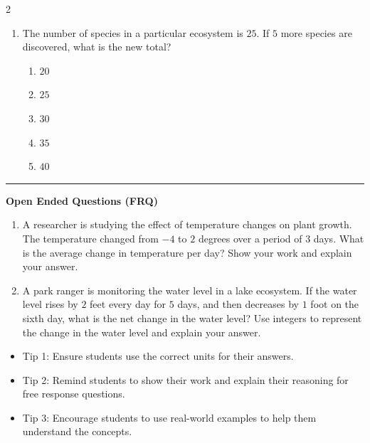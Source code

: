 \documentclass[10pt]{article}
\begin{document}
\begin{multicols}{2}
\begin{enumerate}[label=\textbf{Q\arabic*.}, leftmargin=*, itemsep=6pt, parsep=0pt]
  \item \small The number of species in a particular ecosystem is $25$. If $5$ more species are discovered, what is the new total?
  \begin{enumerate}[label=(\Alph*), leftmargin=0.6cm, nosep, itemsep=2pt]
    \item $20$
    \item $25$
    \item $30$
    \item $35$
    \item $40$
  \end{enumerate}

\end{enumerate}
\end{multicols}

\vspace{-0.2cm}
\hrule
\vspace{0.2cm}
\textbf{\small Open Ended Questions (FRQ)}
\begin{enumerate}[label=\textbf{Q\arabic*.}, start=9, itemsep=5pt, topsep=0pt]

  \item \small A researcher is studying the effect of temperature changes on plant growth. The temperature changed from $-4$ to $2$ degrees over a period of $3$ days. What is the average change in temperature per day? Show your work and explain your answer. \vspace{2cm}

  \item \small A park ranger is monitoring the water level in a lake ecosystem. If the water level rises by $2$ feet every day for $5$ days, and then decreases by $1$ foot on the sixth day, what is the net change in the water level? Use integers to represent the change in the water level and explain your answer. \vspace{2cm}

\end{enumerate}

\vfill

\begin{tcolorbox}[colback=blue!5, colframe=mainblue!50, title=\small \textbf{Chef's Tips}, fonttitle=\bfseries, bottom=1mm]
\begin{itemize}[noitemsep, topsep=2pt, leftmargin=0.5cm]
  \item \scriptsize Tip 1: Ensure students use the correct units for their answers.\item \scriptsize Tip 2: Remind students to show their work and explain their reasoning for free response questions.\item \scriptsize Tip 3: Encourage students to use real-world examples to help them understand the concepts.
\end{itemize}
\end{tcolorbox}
\end{document}
